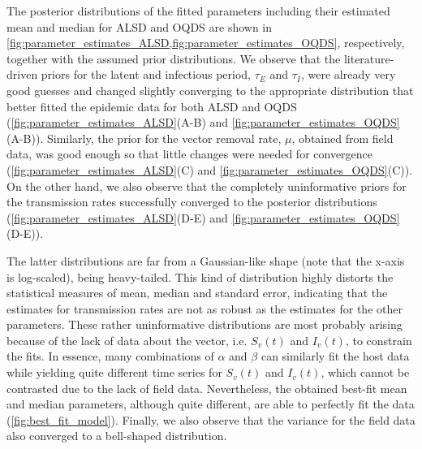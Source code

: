 The posterior distributions of the fitted parameters including their
estimated mean and median for ALSD and OQDS are shown in
\cref{fig:parameter_estimates_ALSD,fig:parameter_estimates_OQDS}, respectively,
together with the assumed prior distributions. We observe that the
literature-driven priors for the latent and infectious period, $\tau_E$ and
$\tau_I$, were already very good guesses and changed slightly converging to the
appropriate distribution that better fitted the epidemic data for both ALSD and
OQDS (\cref{fig:parameter_estimates_ALSD}(A-B) and
\cref{fig:parameter_estimates_OQDS}(A-B)). Similarly, the prior for the vector
removal rate, $\mu$, obtained from field data, was good enough so that little
changes were needed for convergence (\cref{fig:parameter_estimates_ALSD}(C) and
\cref{fig:parameter_estimates_OQDS}(C)). On the other hand, we also observe
that the completely uninformative priors for the transmission rates
successfully converged to the posterior distributions
(\cref{fig:parameter_estimates_ALSD}(D-E) and
\cref{fig:parameter_estimates_OQDS}(D-E)).

The latter distributions are far from a Gaussian-like shape (note that the
x-axis is log-scaled), being heavy-tailed. This kind of distribution highly
distorts the statistical measures of mean, median and standard error,
indicating that the estimates for transmission rates are not as robust as the
estimates for the other parameters. These rather uninformative distributions
are most probably arising because of the lack of data about the vector, i.e.
$S_v(t)$ and $I_v(t)$, to constrain the fits. In essence, many combinations of
$\alpha$ and $\beta$ can similarly fit the host data while yielding quite
different time series for $S_v(t)$ and $I_v(t)$, which cannot be contrasted due
to the lack of field data. Nevertheless, the obtained best-fit mean and median
parameters, although quite different, are able to perfectly fit the data
(\cref{fig:best_fit_model}). Finally, we also observe that the variance for the
field data also converged to a bell-shaped distribution.

